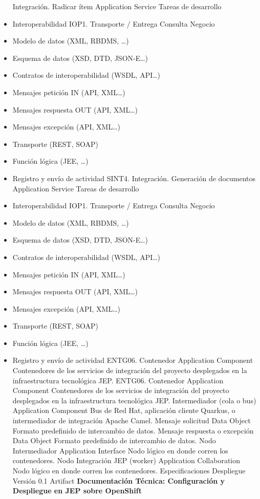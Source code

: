 \documentclass[
  paper=a4,
  ,captions=tableheading
]{scrartcl}
\begin{document}
\begin{itemize}
  Integración. Radicar ítem \textbar{} Application Service \textbar{}
  Tareas de desarrollo
\item
  Interoperabilidad IOP1. Transporte / Entrega Consulta Negocio
\item
  Modelo de datos (XML, RBDMS, \ldots)
\item
  Esquema de datos (XSD, DTD, JSON-E\ldots)
\item
  Contratos de interoperabilidad (WSDL, API\ldots)
\item
  Mensajes petición IN (API, XML\ldots)
\item
  Mensajes respuesta OUT (API, XML\ldots)
\item
  Mensajes excepción (API, XML\ldots)
\item
  Transporte (REST, SOAP)
\item
  Función lógica (JEE, \ldots)
\item
  Registro y envío de actividad \textbar{} \textbar{} SINT4.
  Integración. Generación de documentos \textbar{} Application Service
  \textbar{} Tareas de desarrollo
\item
  Interoperabilidad IOP1. Transporte / Entrega Consulta Negocio
\item
  Modelo de datos (XML, RBDMS, \ldots)
\item
  Esquema de datos (XSD, DTD, JSON-E\ldots)
\item
  Contratos de interoperabilidad (WSDL, API\ldots)
\item
  Mensajes petición IN (API, XML\ldots)
\item
  Mensajes respuesta OUT (API, XML\ldots)
\item
  Mensajes excepción (API, XML\ldots)
\item
  Transporte (REST, SOAP)
\item
  Función lógica (JEE, \ldots)
\item
  Registro y envío de actividad \textbar{} \textbar{} ENTG06. Contenedor
  \textbar{} Application Component \textbar{} Contenedores de los
  servicios de integración del proyecto desplegados en la
  infraestructura tecnológica JEP. \textbar{} \textbar{} ENTG06.
  Contenedor \textbar{} Application Component \textbar{} Contenedores de
  los servicios de integración del proyecto desplegados en la
  infraestructura tecnológica JEP. \textbar{} \textbar{} Intermediador
  (cola o bus) \textbar{} Application Component \textbar{} Bus de Red
  Hat, aplicación cliente Quarkus, o intermediador de integración Apache
  Camel. \textbar{} \textbar{} Mensaje solicitud \textbar{} Data Object
  \textbar{} Formato predefinido de intercambio de datos. \textbar{}
  \textbar{} Mensaje respuesta o excepción \textbar{} Data Object
  \textbar{} Formato predefinido de intercambio de datos. \textbar{}
  \textbar{} Nodo Intermediador \textbar{} Application Interface
  \textbar{} Nodo lógico en donde corren los contenedores. \textbar{}
  \textbar{} Nodo Integración JEP (worker) \textbar{} Application
  Collaboration \textbar{} Nodo lógico en donde corren los contenedores.
  \textbar{} \textbar{} Especificaciones Despliegue Versión 0.1
  \textbar{} Artifact \textbar{} \textbf{Documentación Técnica:
  Configuración y Despliegue en JEP sobre OpenShift}
\end{itemize}
\end{document}
